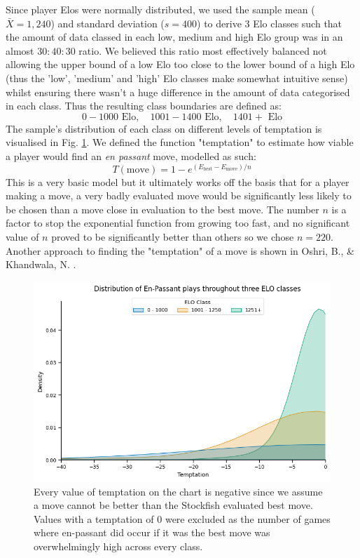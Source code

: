 \documentclass[10pt,a4paper]{article}
\begin{document}
\begin{multicols}{2}
Since player Elos were normally distributed, we used the sample mean ($\bar{X} = 1,240$) and standard deviation ($s = 400$) to derive $3$ Elo classes such that the amount of data classed in each low, medium and high Elo group was in an almost $30:40:30$ ratio. We believed this ratio most effectively balanced not allowing the upper bound of a low Elo too close to the lower bound of a high Elo (thus the 'low', 'medium' and 'high' Elo classes make somewhat intuitive sense) whilst ensuring there wasn't a huge difference in the amount of data categorised in each class. Thus the resulting class boundaries are defined as: 
$$0 - 1000 \text{ Elo},\quad 1001 - 1400 \text{ Elo},\quad 1401+ \text{ Elo}$$
The sample's distribution of each class on different levels of temptation is visualised in Fig. \ref{fds-project-template:fig:ep_distplot}. We defined the function "temptation" to estimate how viable a player would find an \textit{en passant} move, modelled as such:
$$T(\text{move})= 1 -e^{(E_{\text{best}} - E_{\text{move}})/{n}}$$
This is a very basic model but it ultimately works off the basis that for a player making a move, a very badly evaluated move would be significantly less likely to be chosen than a move close in evaluation to the best move. The number $n$ is a factor to stop the exponential function from growing too fast, and no significant value of $n$ proved to be significantly better than others so we chose $n=220$. Another approach to finding the "temptation" of a move is shown in Oshri, B., \& Khandwala, N. \cite{mcilroy2020aligning}.\newline

\begin{figure}[t]
  \centering
  \includegraphics[width=\textwidth]{report/images/ep_distplot.png}
  \caption{Every value of temptation on the chart is negative since we assume a move cannot be better than the Stockfish evaluated best move. Values with a temptation of $0$ were excluded as the number of games where en-passant did occur if it was the best move was overwhelmingly high across every class.}
  \label{fds-project-template:fig:ep_distplot}
\end{figure}


\end{multicols}
\end{document}
